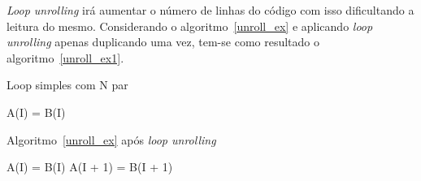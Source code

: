 \textit{Loop unrolling} irá aumentar o número de linhas do código com isso 
dificultando a leitura do mesmo.
Considerando o algoritmo~\ref{unroll_ex} e aplicando \textit{loop unrolling}
apenas duplicando uma vez, 
tem-se como resultado o algoritmo~\ref{unroll_ex1}.

\begin{algorithm}
\caption{Loop simples com N par}
\label{unroll_ex}
\begin{algorithmic}[1]

\STATE A(I) = B(I)
\ENDFOR

\end{algorithmic}
\end{algorithm}

\begin{algorithm}
        \caption{Algoritmo~\ref{unroll_ex} após \textit{loop unrolling}}
\label{unroll_ex1}
\begin{algorithmic}[1]

\STATE A(I) = B(I)
\STATE A(I + 1) = B(I + 1)
\ENDFOR

\end{algorithmic}
\end{algorithm}
